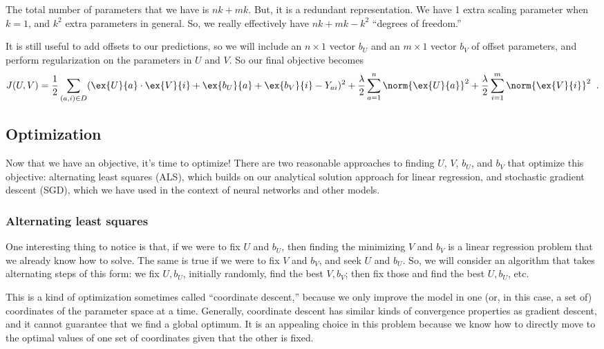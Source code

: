The total number of parameters that we have is $nk + mk$. But, it is
a redundant representation. We have 1 extra scaling parameter when
$k=1$, and $k^2$ extra parameters in general. So, we really effectively have
$nk + mk - k^2$ ``degrees of freedom.''

It is still useful to add offsets to our predictions, so we will
include an $n \times 1$ vector $b_U$ and an $m \times 1$ vector $b_V$
of offset parameters, and perform regularization on the parameters in
$U$ and $V$.  So our final objective becomes
\[
  J(U,V) = \frac{1}{2} \sum_{(a,i)\in D}
  (\ex{U}{a} \cdot \ex{V}{i} + \ex{b_U}{a} + \ex{b_V}{i}
  - Y_{ai})^2
  + \frac{\lambda}{2} \sum_{a=1}^n \norm{\ex{U}{a}}^2
  + \frac{\lambda}{2} \sum_{i=1}^m \norm{\ex{V}{i}}^2
  \;\;.\]

\subsection{Optimization}
Now that we have an objective, it's  time to optimize!  There are two
reasonable approaches to finding $U$, $V$, $b_U$, and $b_V$ that
optimize this objective:  alternating least squares (ALS), which builds on
our analytical solution approach for linear regression, and
stochastic gradient descent (SGD), which we have used in the context
of neural networks and other models.

\subsubsection{Alternating least squares}
One interesting thing to notice is that, if we were to fix $U$ and
$b_U$, then finding the minimizing $V$ and $b_V$ is a linear
regression problem that we already know how to solve.  The same is
true if we were to fix $V$ and $b_V$, and seek $U$ and $b_U$.
So, we will consider an algorithm that takes alternating steps of this
form:  we fix $U, b_U$, initially randomly, find the best $V, b_V$;
then fix those and find the best $U, b_U$, etc.

This is a kind of optimization sometimes called ``coordinate
descent,''  because we only improve the model in one (or, in this
case, a set of) coordinates of the parameter space at a time.
Generally, coordinate descent has similar kinds of convergence
properties as gradient descent, and it cannot guarantee that we find a
global optimum.  It is an appealing choice in this problem because we
know how to directly move to the optimal values of one set of
coordinates given that the other is fixed.

